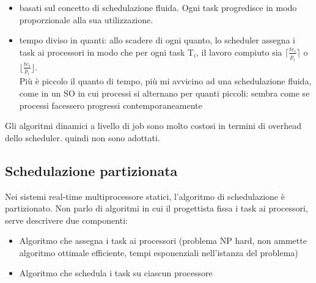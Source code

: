 \documentclass[18px]{article}
\begin{document}
\begin{itemize}
\item basati sul concetto di schedulazione fluida. Ogni task progredisce in modo proporzionale alla sua utilizzazione.
\item tempo diviso in quanti: allo scadere di ogni quanto, lo scheduler assegna i task ai processori in modo che per ogni task T$_{i}$, il lavoro compiuto sia $\lceil \frac{te_i}{p_i}\rceil$ o $\lfloor\frac{te_i}{p_i}\rfloor$.\\ Più è piccolo il quanto di tempo, più mi avvicino ad una schedulazione fluida, come in un SO in cui processi si alternano per quanti piccoli: sembra come se processi facessero progressi contemporaneamente
\end{itemize}
Gli algoritmi dinamici a livello di job sono molto costosi in termini di overhead dello scheduler. quindi non sono adottati.
\subsection{Schedulazione partizionata}
Nei sistemi real-time multiprocessore statici, l'algoritmo di schedulazione è partizionato. Non parlo di algoritmi in cui il progettista fissa i task ai processori, serve descrivere due componenti:
\begin{itemize}
\item Algoritmo che assegna i task ai processori (problema NP hard, non ammette algoritmo ottimale efficiente, tempi esponenziali nell'istanza del problema)
\item Algoritmo che schedula i task su ciascun processore
\end{itemize}
\end{document}
